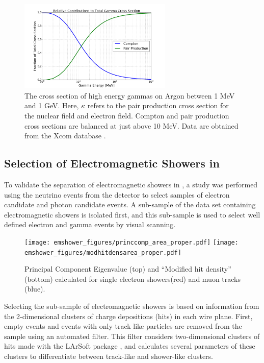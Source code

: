 \begin{figure}[ht!]
  \centering
  \includegraphics[width=0.65\textwidth]{emshower_figures/relative_photonCrossSection.png}
  \caption[Comparison of Compton to Pair Production Cross Section]{\label{fig:relative_gamma_xsec} The cross section of high energy gammas on Argon between 1 MeV and 1 GeV.  Here, $\kappa$ refers to the pair production cross section for the nuclear field and electron field.  Compton and pair production cross sections are balanced at just above 10 MeV.  Data are obtained from the Xcom database \cite{Xcom}.}
\end{figure}


\subsection{Selection of Electromagnetic Showers in \argoneut}

To validate the separation of electromagnetic showers in \lartpcs, a study was performed using the neutrino events from the \argoneut detector to select samples of electron candidate and photon candidate events.  A sub-sample of the \argoneut data set containing electromagnetic showers is isolated first, and this sub-sample is used to select well defined electron and gamma events by visual scanning.


\begin{figure}[htb]
\centering
\texttt{[image: emshower\_figures/princcomp\_area\_proper.pdf]}
\texttt{[image: emshower\_figures/modhitdensarea\_proper.pdf]}
\caption[Discrimination variables for Shower Identification]{\label{fig:separation} Principal Component Eigenvalue (top) and ``Modified hit density'' (bottom) calculated for single electron showers(red) and muon tracks (blue).}
\end{figure}

Selecting the sub-sample of electromagnetic showers is based on information from the 2-dimensional clusters of charge depositions (hits) in each wire plane. First, empty events and events with only track like particles are removed from the sample using an automated filter. This filter considers two-dimensional clusters of hits made with the LArSoft package \cite{Church:2013hea}, and calculates several parameters of these clusters to differentiate between track-like and shower-like clusters. 


